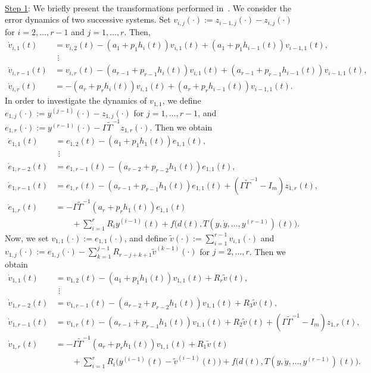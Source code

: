 \documentclass[ envcountsect, envcountsame]{svjour3}
\begin{document}
\ \\
\underline{Step 1}: We briefly present the transformations performed in~\cite[p. 4758-4760]{BergReis18b}. 
We consider the error dynamics of two successive systems. Set $v_{i,j}(\cdot) := z_{i-1,j}(\cdot) - z_{i,j}(\cdot)$ for $i=2,\ldots,r-1$ and $j=1,\ldots,r$. Then,
\begin{equation*}
\begin{aligned}
\dot v_{i,1}(t) &= v_{i,2}(t) - (a_1 + p_1 h_i(t)) v_{i,1}(t) + (a_1 + p_1 h_{i-1}(t))v_{i-1,1}(t) , \\
& \ \, \vdots \\
\dot v_{i,r-1}(t) &= v_{i,r}(t) - (a_{r-1} + p_{r-1} h_{i}(t))v_{i,1}(t) + (a_{r-1} + p_{r-1}h_{i-1}(t))v_{i-1,1}(t) , \\
\dot v_{i,r}(t) &= -(a_r + p_r h_i(t)) v_{i,1}(t) + (a_r + p_r h_{i-1}(t)) v_{i-1,1}(t).
\end{aligned}
\end{equation*}
In order to investigate the dynamics of $v_{1,1}$, we define $e_{1,j}(\cdot) := y^{(j-1)}(\cdot) - z_{1,j}(\cdot)$ for $j=1,\ldots,r-1$, 
and $e_{1,r}(\cdot) := y^{(r-1)}(\cdot) - \Gamma \tilde \Gamma^{-1} z_{1,r}(\cdot)$. Then we obtain
\begin{equation*}
\begin{aligned}
\dot e_{1,1}(t) &= e_{1,2}(t) - (a_1 +  p_1 h_1(t))e_{1,1}(t) , \\
& \ \, \vdots \\
\dot e_{1,r-2}(t) &= e_{1,r-1}(t) - (a_{r-2} + p_{r-2} h_1(t))e_{1,1}(t) , \\
\dot e_{1,r-1}(t) &= e_{1,r}(t) - (a_{r-1} + p_{r-1} h_1(t))e_{1,1}(t) + (\Gamma \tilde \Gamma^{-1} - I_m) z_{1,r}(t) , \\
\dot e_{1,r}(t) &= -\Gamma \tilde \Gamma^{-1}(a_r + p_r h_1(t))e_{1,1}(t) \\
& \qquad + \sum_{i=1}^{r} R_i y^{(i-1)}(t) + f\big( d(t),T(y,\dot y,\ldots,y^{(r-1)})(t) \big).
\end{aligned}
\end{equation*}
Now, we set $v_{1,1}(\cdot) := e_{1,1}(\cdot)$, and define $\tilde v(\cdot) := \sum_{i=1}^{r-1} v_{i,1}(\cdot)$ 
and $v_{1,j}(\cdot) := e_{1,j}(\cdot) - \sum_{k=1}^{j-1} R_{r-j+k+1} \tilde v^{(k-1)}(\cdot)$ 
for $j=2,\ldots,r$. Then we obtain
\begin{equation*}
\begin{aligned}
\dot v_{1,1}(t) &= v_{1,2}(t) - (a_1 + p_1 h_1(t)) v_{1,1}(t) + R_r \tilde v(t) , \\
& \ \, \vdots \\
\dot v_{1,r-2}(t) &= v_{1,r-1}(t) - (a_{r-2} + p_{r-2} h_1(t)) v_{1,1}(t) + R_3 \tilde v(t) , \\
\dot v_{1,r-1}(t) &= v_{1,r}(t) - (a_{r-1} + p_{r-1} h_1(t)) v_{1,1}(t) + R_2 \tilde v(t) + (\Gamma \tilde \Gamma^{-1} - I_m) z_{1,r}(t)  , \\
\dot v_{1,r}(t)  &= -\Gamma \tilde \Gamma^{-1}(a_r + p_r h_1(t))v_{1,1}(t) + R_1 \tilde v(t) \\
& \qquad + \sum_{i=1}^{r} R_i \big( y^{(i-1)}(t)-\tilde v^{(i-1)}(t) \big) 
+ f\big( d(t),T(y,\dot y,\ldots,y^{(r-1)})(t) \big). 
\end{aligned}
\end{equation*}
\end{document}
